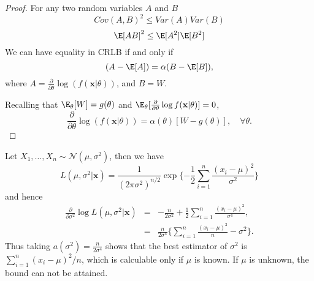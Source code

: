 \documentclass[a4paper,english,12pt]{article}
\newcommand{\bx}{\mathbf{x}}
\begin{document}
\begin{proof}
For any two random variables $A$ and $B$
\begin{equation}
Cov(A,B)^2 \leq Var(A)Var(B)
\end{equation}
\begin{equation}
\E[AB]^2 \leq \E[A^2]\E[B^2]
\end{equation}
We can have equality in CRLB if and only if
\begin{equation}
(A-\E[A]) = \alpha(B-\E[B]),
\end{equation}
where $A = \frac{\partial}{\partial\theta} \log(f(\bx|\theta))$, and $B=W$.
\par Recalling that $\E_\theta[W] = g(\theta)$ and $\E_\theta[\frac{\partial}{\partial\theta} \log f(\bx|\theta)] = 0$,
\begin{equation}
\frac{\partial}{\partial\theta} \log(f(\bx|\theta)) = \alpha(\theta)[W-g(\theta)], \quad \forall \theta.
\end{equation}
\end{proof}
\begin{exmp}[Application]
\par Let $X_1,\dots,X_n \sim \mathcal{N}(\mu,\sigma^{2})$, then we have
\begin{equation}
L(\mu,\sigma^2|\bx) = \frac{1}{(2\pi\sigma^2)^{n/2}}\exp\{-\frac{1}{2}\sum_{i=1}^{n}\frac{(x_i-\mu)^2}{\sigma^2}\}
\end{equation}
and hence
\begin{eqnarray}
\frac{\partial}{\partial\sigma^2}\log L(\mu,\sigma^2|\bx) &=& -\frac{n}{2\sigma^2} + \frac{1}{2}\sum_{i=1}^{n}\frac{(x_i-\mu)^2}{\sigma^4},\nonumber\\
&=& \frac{n}{2\sigma^4}\{\sum_{i=1}^{n}\frac{(x_i-\mu)^2}{n} - \sigma^2\}.
\end{eqnarray}
Thus taking $a(\sigma^2) = \frac{n}{2\sigma^4}$ shows that the best estimator of $\sigma^2$ is $\sum_{i=1}^{n}{(x_i-\mu)^2}/{n}$, which is calculable only if $\mu$ is known. If $\mu$ is unknown, the bound can not be attained.
\end{exmp}
\end{document}
